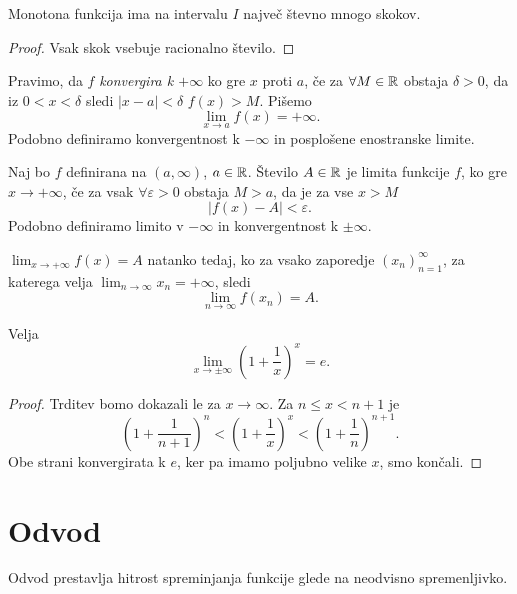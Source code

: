 \documentclass[12pt, a4paper]{article}
\begin{document}
\begin{posledica}
Monotona funkcija ima na intervalu $I$ največ števno mnogo skokov.
\end{posledica}

\begin{proof}
Vsak skok vsebuje racionalno število.
\end{proof}

\begin{definicija}
Pravimo, da $f$ \emph{konvergira k $+\infty$} ko gre $x$ proti $a$, če za $\forall M\in\mathbb{R}$ obstaja $\delta>0$, da iz $0<x<\delta$ sledi $|x-a|<\delta$ $f(x)>M$. Pišemo
\[
\lim_{x\to a}f(x)=+\infty.
\]
Podobno definiramo konvergentnost k $-\infty$ in posplošene enostranske limite.
\end{definicija}

\begin{definicija}
Naj bo $f$ definirana na $(a,\infty)$, $a\in\mathbb{R}$. Število $A\in\mathbb{R}$ je limita funkcije $f$, ko gre $x\to+\infty$, če za vsak $\forall\varepsilon>0$ obstaja $M>a$, da je za vse $x>M$
\[
|f(x)-A|<\varepsilon.
\]
Podobno definiramo limito v $-\infty$ in konvergentnost k $\pm\infty$.
\end{definicija}

\begin{opomba}
$\displaystyle\lim_{x\to+\infty}f(x)=A$ natanko tedaj, ko za vsako zaporedje $(x_n)_{n=1}^\infty$, za katerega velja $\displaystyle\lim_{n\to\infty}x_n=+\infty$, sledi
\[
\lim_{n\to\infty}f(x_n)=A.
\]
\end{opomba}

\begin{trditev}
Velja
\[
\lim_{x\to\pm\infty}\left(1+\frac{1}{x}\right)^x=e.
\]
\end{trditev}

\begin{proof}
Trditev bomo dokazali le za $x\to\infty$. Za $n\leq x<n+1$ je
\[
\left(1+\frac{1}{n+1}\right)^n<\left(1+\frac{1}{x}\right)^x<\left(1+\frac{1}{n}\right)^{n+1}.
\]
Obe strani konvergirata k $e$, ker pa imamo poljubno velike $x$, smo končali.
\end{proof}

\newpage

\section{Odvod}

Odvod prestavlja hitrost spreminjanja funkcije glede na neodvisno spremenljivko.
\end{document}
